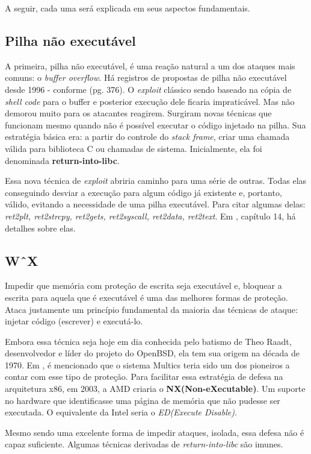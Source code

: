 		
		A seguir, cada uma será explicada em seus aspectos fundamentais.
		\subsection{Pilha não executável}
			A primeira, pilha não executável, é uma reação natural a um dos ataques mais comuns:
			o \textsl{buffer overflow}. Há registros de propostas de pilha não executável desde 1996 -
			conforme \cite{Anley2007}(pg. 376). O \textsl{exploit} clássico sendo baseado na cópia
			de \textsl{shell code} para o buffer e posterior execução dele ficaria impraticável.
			Mas não demorou muito para os atacantes reagirem. Surgiram novas técnicas que funcionam
			mesmo quando não é possível executar o código injetado na pilha.
			Sua estratégia básica era: a partir do controle do \textsl{stack frame}, criar uma chamada
			válida para biblioteca C ou chamadas de sistema. Inicialmente, ela foi denominada \textbf{return-into-libc}.
			
			
			Essa nova técnica de \textsl{exploit} abriria caminho para uma série de outras.
			Todas elas conseguindo desviar a execução para algum código já existente e, portanto,
			válido, evitando a necessidade de uma pilha executável.
			Para citar algumas delas: 
			\textsl{ret2plt, ret2strcpy, ret2gets, ret2syscall, ret2data, ret2text}.
			Em \cite{Anley2007}, capítulo 14, há detalhes sobre elas.
		

		\subsection{W\^\ X}
			Impedir que memória com proteção de escrita seja executável e, bloquear a escrita
			para aquela que é executável é uma das melhores formas de proteção.
			Ataca justamente um princípio fundamental da maioria das técnicas de ataque: injetar código
			(escrever) e executá-lo.	
			

			Embora essa técnica seja hoje em dia conhecida pelo batismo de Theo Raadt, desenvolvedor
			e líder do projeto do OpenBSD, ela tem sua origem na década de 1970. Em \cite{Anley2007},
			é mencionado que o sistema Multics teria sido um dos pioneiros a contar com esse tipo de
			proteção. Para facilitar essa estratégia de defesa na arquitetura x86, em 2003, a AMD
			criaria o \textbf{NX(Non-eXecutable)}. Um suporte no hardware que identificasse uma página de
			memória que não pudesse ser executada. O equivalente da Intel seria o \textsl{ED(Execute Disable)}.


			Mesmo sendo uma excelente forma de impedir ataques, isolada, essa defesa não é capaz
			suficiente. Algumas técnicas derivadas de \textsl{return-into-libc} são imunes.


